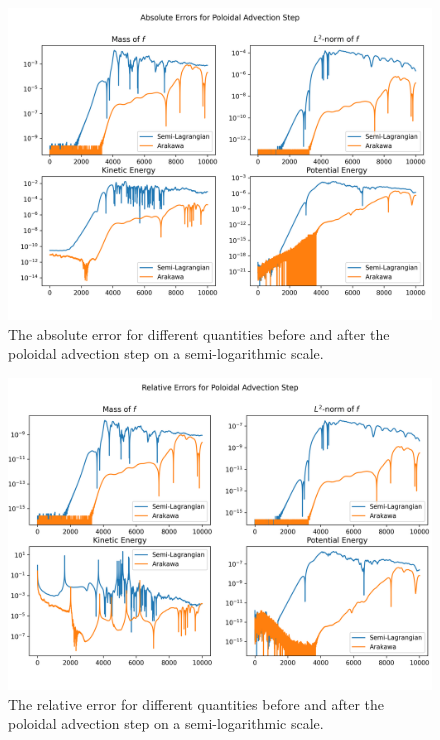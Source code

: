 \begin{figure}
	\centering
	\includegraphics[width=0.9\linewidth]{plots/abs_err_log}
	\caption{The absolute error for different quantities before and after the poloidal advection step on a semi-logarithmic scale.}
	\label{fig:abserrlog}
\end{figure}

\begin{figure}
	\centering
	\includegraphics[width=0.9\linewidth]{plots/rel_err_log}
	\caption{The relative error for different quantities before and after the poloidal advection step on a semi-logarithmic scale.}
	\label{fig:relerrlog}
\end{figure}

